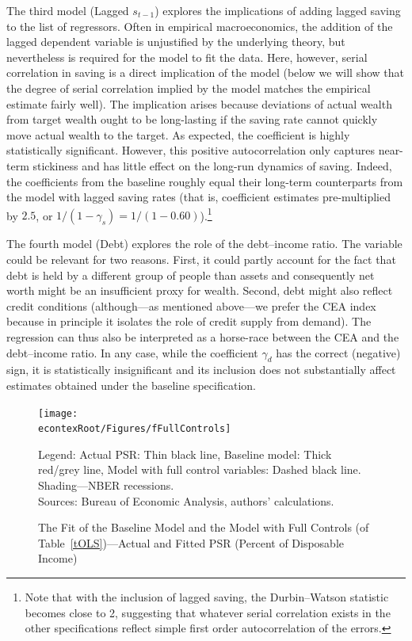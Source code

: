 \documentclass[titlepage]{\econtex}
\begin{document}
The third model (Lagged $s_{t-1}$) explores the implications of adding lagged saving to the list of regressors.  Often in empirical
macroeconomics, the addition of the lagged dependent variable is unjustified by the underlying theory, but nevertheless is required
for the model to fit the data.  Here, however, serial correlation in saving is a direct implication of the model (below we will show that the degree of serial correlation implied by the model matches the empirical estimate fairly well).  The implication arises because deviations of actual wealth from target wealth ought to be long-lasting if the saving rate cannot quickly move actual wealth to the target.  As expected, the coefficient is highly statistically significant.  However, this positive autocorrelation only captures near-term stickiness and has little effect on the long-run dynamics of saving. Indeed, the coefficients from the baseline roughly equal their long-term counterparts from the model with lagged saving rates (that is, coefficient estimates pre-multiplied by $2.5$, or $1/(1-\gamma_s)=1/(1-0.60)$).\footnote{Note that with the inclusion
  of lagged saving, the Durbin--Watson statistic becomes close to 2,
  suggesting that whatever serial correlation exists in the
  other specifications reflect simple first order autocorrelation of
  the errors.}

The fourth model (Debt) explores the role of the debt--income ratio. The variable could be relevant for two reasons. First, it could partly account for the fact that debt is held by a different group of people than assets and consequently net worth might be an insufficient proxy for wealth. Second, debt might also reflect credit conditions (although---as mentioned above---we prefer the CEA index because in principle it isolates the role of credit supply from demand). The regression can thus also be interpreted as a horse-race between the CEA and the debt--income ratio. In any case, while the coefficient $\gamma_d$ has the correct (negative) sign, it is statistically insignificant and its inclusion does not substantially affect estimates obtained under the baseline specification.


\hypertarget{fFullControls}{}
\begin{figure}
\caption{The Fit of the Baseline Model and the Model with Full Controls (of Table~\ref{tOLS})---Actual and Fitted PSR (Percent of Disposable Income)}
\label{fFullControls}
\texttt{[image: \\econtexRoot/Figures/fFullControls]}

\footnotesize
Legend: Actual PSR: Thin black line, Baseline model: Thick red/grey line, Model with full control variables: Dashed black line. Shading---NBER recessions.\\[0mm]
\tiny Sources: Bureau of Economic Analysis, authors' calculations.
\end{figure}
\end{document}
